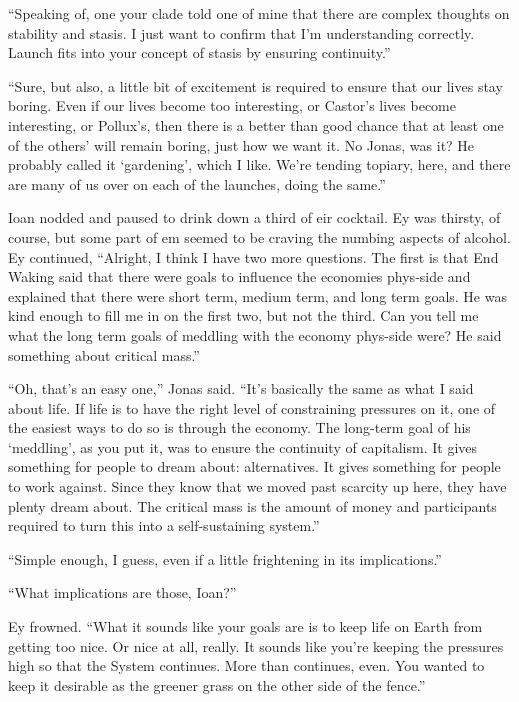 ``Speaking of, one your clade told one of mine that there are complex thoughts on stability and stasis. I just want to confirm that I'm understanding correctly. Launch fits into your concept of stasis by ensuring continuity.''

``Sure, but also, a little bit of excitement is required to ensure that our lives stay boring. Even if our lives become too interesting, or Castor's lives become interesting, or Pollux's, then there is a better than good chance that at least one of the others' will remain boring, just how we want it. No Jonas, was it? He probably called it `gardening', which I like. We're tending topiary, here, and there are many of us over on each of the launches, doing the same.''

Ioan nodded and paused to drink down a third of eir cocktail. Ey was thirsty, of course, but some part of em seemed to be craving the numbing aspects of alcohol. Ey continued, ``Alright, I think I have two more questions. The first is that End Waking said that there were goals to influence the economies phys-side and explained that there were short term, medium term, and long term goals. He was kind enough to fill me in on the first two, but not the third. Can you tell me what the long term goals of meddling with the economy phys-side were? He said something about critical mass.''

``Oh, that's an easy one,'' Jonas said. ``It's basically the same as what I said about life. If life is to have the right level of constraining pressures on it, one of the easiest ways to do so is through the economy. The long-term goal of his `meddling', as you put it, was to ensure the continuity of capitalism. It gives something for people to dream about: alternatives. It gives something for people to work against. Since they know that we moved past scarcity up here, they have plenty dream about. The critical mass is the amount of money and participants required to turn this into a self-sustaining system.''

``Simple enough, I guess, even if a little frightening in its implications.''

``What implications are those, Ioan?''

Ey frowned. ``What it sounds like your goals are is to keep life on Earth from getting too nice. Or nice at all, really. It sounds like you're keeping the pressures high so that the System continues. More than continues, even. You wanted to keep it desirable as the greener grass on the other side of the fence.''

